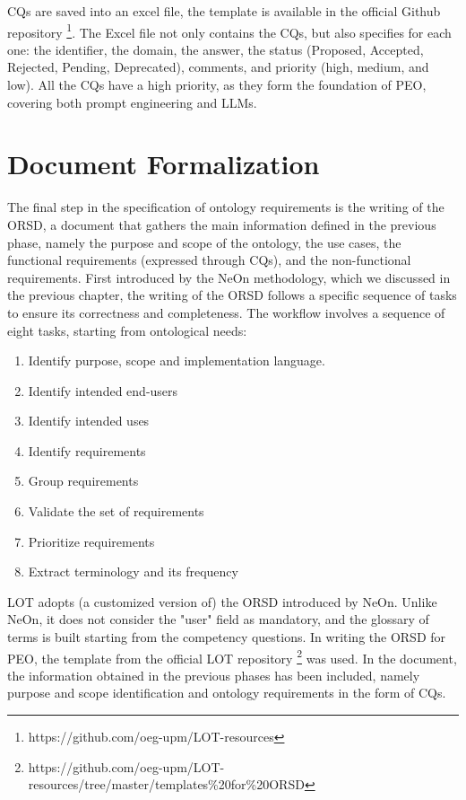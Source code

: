 CQs are saved into an excel file, the template is available in the official Github repository \footnote{https://github.com/oeg-upm/LOT-resources}.
The Excel file not only contains the CQs, but also specifies for each one: the identifier, the domain, the answer, the status (Proposed, Accepted, Rejected, Pending, Deprecated), comments, and priority (high, medium, and low).
All the CQs have a high priority, as they form the foundation of PEO, covering both prompt engineering and LLMs.

\section{Document Formalization}
The final step in the specification of ontology requirements is the writing of the ORSD, a document that gathers the main information defined in the previous phase, namely the purpose and scope of the ontology, the use cases, the functional requirements (expressed through CQs), and the non-functional requirements.
First introduced by the NeOn methodology, which we discussed in the previous chapter, the writing of the ORSD follows a specific sequence of tasks to ensure its correctness and completeness.
The workflow \cite{suarez2009write} involves a sequence of eight tasks, starting from ontological needs: 
\begin{enumerate}
    \item Identify purpose, scope and implementation language.
    \item Identify intended end-users
    \item Identify intended uses
    \item Identify requirements
    \item Group requirements
    \item Validate the set of requirements
    \item Prioritize requirements
    \item Extract terminology and its frequency
\end{enumerate}
LOT adopts (a customized version of) the ORSD introduced by NeOn.
Unlike NeOn, it does not consider the "user" field as mandatory, and the glossary of terms is built starting from the competency questions.
In writing the ORSD for PEO, the  template from the official LOT repository \footnote{https://github.com/oeg-upm/LOT-resources/tree/master/templates\%20for\%20ORSD} was used. 
In the document, the information obtained in the previous phases has been included, namely purpose and scope identification and ontology requirements in the form of CQs.
